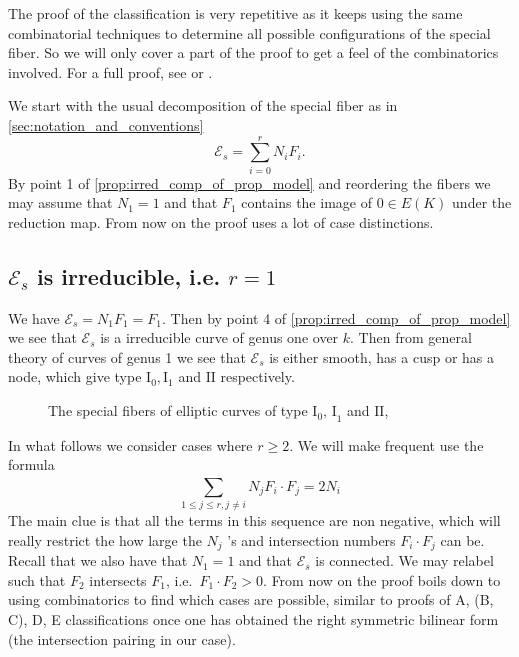 
The proof of the classification is very repetitive as it keeps using the same combinatorial techniques to determine all possible configurations of the special fiber. 
So we will only cover a part of the proof to get a feel of the combinatorics involved. 
For a full proof, see \cite[sec.\ IV.8]{silvermanAdvancedTopicsArithmetic1994} or \cite[sec.\ 10.2.1]{liuAlgebraicGeometryArithmetic2002}.

\medskip 
We start with the usual decomposition of the special fiber as in \cref{sec:notation_and_conventions}  \[
	\mathscr E_s = \sum_{i = 0}^{r} N_i F_i
.\]  
By point 1 of \cref{prop:irred_comp_of_prop_model} and reordering the fibers we may assume that $N_1 = 1$ and that $F_1$ contains the image of $0 \in E (K)$ under the reduction map. 
From now on the proof uses a lot of case distinctions. 
\subsection{$\mathscr E _s$ is irreducible, i.e. $r = 1$} \label{sec:C_s_is_irreducible,_i.e._r_=_1}
We have $\mathscr E _s = N_1 F_1 = F_1$. Then by point 4 of \cref{prop:irred_comp_of_prop_model} we see that  $\mathscr E_s$ is a irreducible curve of genus one over $k$. 
Then from general theory of curves of genus 1 we see that $\mathscr E _s$ is either smooth, has a cusp or has a node, which give type $\text{I}_0, \text{I}_1$ and $\text{II}$ respectively.  

\begin{figure}[ht]
    \centering
    \caption{The special fibers of elliptic curves of type $\text{I}_0 \text{, I}_1$ and $\text{II}$,}
    \label{fig:type-i2-iii}
\end{figure}

\bigskip
In what follows we consider cases where $r \ge 2$. We will make frequent use the formula 
\begin{equation}\label{eq:sum_intersections}
	\sum_{1 \le j \le r, j \ne i}^{} N_j F_i \cdot F_j = 2 N_i
\end{equation}
The main clue is that all the terms in this sequence are non negative, which will really restrict the how large the $N_j$ 's and intersection numbers  $F_i \cdot  F_j$ can be.
Recall that we also have that $N_1 = 1$ and that $\mathscr E _s$ is connected. We may relabel such that $F_2$ intersects $F_1$, i.e.\  $F_1 \cdot F_2 > 0$.  
From now on the proof boils down to using combinatorics to find which cases are possible, similar to proofs of A, (B, C), D, E classifications once one has obtained the right symmetric bilinear form (the intersection pairing in our case).  



